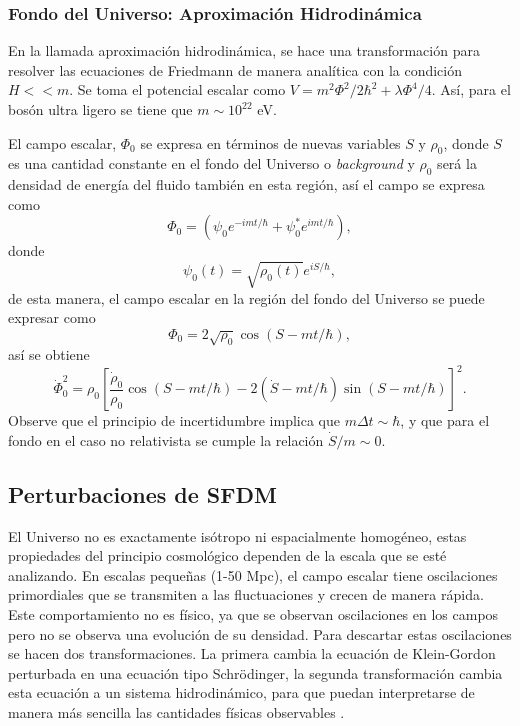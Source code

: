 \documentclass[a4paper,openright,10pt, oneside, final]{book}
\begin{document}
\subsubsection{Fondo del Universo: Aproximación Hidrodinámica}
En la llamada aproximación hidrodinámica, se hace una transformación para resolver las ecuaciones de Friedmann de manera analítica con la condición $H<<m$. Se toma el potencial escalar como $V = m^{2}\Phi^{2}/2\hbar^{2} + \lambda\Phi^{4}/4$. Así, para el bosón ultra ligero se tiene que $m \sim 10^{22}$ eV.

El campo escalar, $\Phi_{0}$ se expresa en términos de nuevas variables $S$ y $\rho_{0}$, donde $S$ es una cantidad constante en el fondo del Universo o \textit{background} y $\rho_{0}$ será la densidad de energía del fluido también en esta región, así el campo se expresa como
\begin{equation}
\Phi_{0} = (\psi_{0}e^{-imt/\hbar} + \psi_{0}^{*}e^{imt/\hbar}),\label{eqn 1.60}
\end{equation}
donde
\begin{equation}
\psi_{0}(t) = \sqrt{\rho_{0}(t)}e^{iS/\hbar},\label{eqn 1.61}
\end{equation}
de esta manera, el campo escalar en la región del fondo del Universo se puede expresar como 
\begin{equation}
\Phi_{0}=2\sqrt{\rho_{0}}\cos(S-mt/\hbar),\label{eqn 1.62}
\end{equation}
así se obtiene
\begin{equation}
\dot{\Phi}_{0}^{2} = \rho_{0} 
\left[
\frac{\dot{\rho}_{0}}{\rho_{0}}\cos(S-mt/\hbar) 
- 2(\dot{S}-mt/\hbar)\sin(S-mt/\hbar)
\right]^{2}.\label{eqn 1.63}
\end{equation}
Observe que el principio de incertidumbre implica que $m \Delta t \sim \hbar$, y que para el fondo en el caso no relativista se cumple la relación $\dot{S}/m \sim 0$. 
\subsection{Perturbaciones de SFDM}
El Universo no es exactamente isótropo ni espacialmente homogéneo, estas propiedades del principio cosmológico dependen de la escala que se esté analizando. En escalas pequeñas (1-50 Mpc), el campo escalar tiene oscilaciones primordiales que se transmiten a las fluctuaciones y crecen de manera rápida. Este comportamiento no es físico, ya que se observan oscilaciones en los campos pero no se observa una evolución de su densidad. Para descartar estas oscilaciones se hacen dos transformaciones. La primera cambia la ecuación de Klein-Gordon perturbada en una ecuación tipo Schrödinger, la segunda transformación cambia esta ecuación a un sistema hidrodinámico, para que puedan interpretarse de manera más sencilla las cantidades físicas observables \cite{1.3.02.2}.
\end{document}

